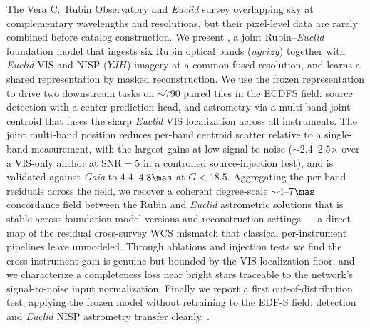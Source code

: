 The Vera C.\ Rubin Observatory and \textit{Euclid} survey overlapping sky at
complementary wavelengths and resolutions, but their pixel-level data are
rarely combined before catalog construction. We present \jaisp{}, a joint
Rubin--\textit{Euclid} foundation model that ingests six Rubin optical bands
($ugrizy$) together with \textit{Euclid} VIS and NISP ($Y\!J\!H$) imagery at a
common fused resolution, and learns a shared representation by masked
reconstruction. We use the frozen representation to drive two downstream tasks
on $\sim$790 paired tiles in the ECDFS field: source detection with a
center-prediction head, and astrometry via a multi-band joint centroid that
fuses the sharp \textit{Euclid} VIS localization across all instruments.
The joint multi-band position reduces per-band centroid scatter relative to a
single-band measurement, with the largest gains at low signal-to-noise
($\sim$2.4--2.5$\times$ over a VIS-only anchor at $\mathrm{SNR}=5$ in a
controlled source-injection test), and is validated against \textit{Gaia} to
$4.4$--$4.8\mas$ at $G<18.5$. Aggregating the per-band residuals across the
field, we recover a coherent degree-scale $\sim$4--7$\mas$ concordance field
between the Rubin and \textit{Euclid} astrometric solutions that is stable
across foundation-model versions and reconstruction settings --- a direct map
of the residual cross-survey WCS mismatch that classical per-instrument
pipelines leave unmodeled. Through ablations and injection tests we find the
cross-instrument gain is genuine but bounded by the VIS localization floor, and
we characterize a completeness loss near bright stars traceable to the
network's signal-to-noise input normalization.
Finally we report a first out-of-distribution test, applying the frozen model
without retraining to the EDF-S field: detection and \textit{Euclid} NISP
astrometry transfer cleanly, . 
